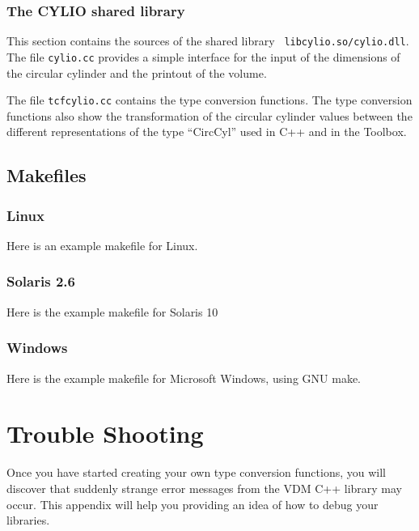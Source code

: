 \documentclass[\pformat,12pt]{article}
\begin{document}
\subsubsection{The CYLIO shared library}\label{sub:cylio}

This section contains the sources of the shared library {\tt
libcylio.so/cylio.dll}. 
The file {\tt cylio.cc} provides a simple interface for the input of the
dimensions of the circular cylinder and the printout of the volume.

The file {\tt tcfcylio.cc} contains the type conversion functions.
The type conversion functions also show the transformation of the
circular cylinder values between the different representations of
the type ``CircCyl'' used in C++ and in the Toolbox.




  
\subsection{Makefiles}\label{makefiles}


\subsubsection{Linux}\label{makefiles:linux}

Here is an example makefile for Linux. 




\subsubsection{Solaris 2.6}\label{makefiles:sunos5}
Here is the example makefile for Solaris 10




\subsubsection{Windows}\label{makefiles:win}
Here is the example makefile for Microsoft Windows, using GNU make.






\section{Trouble Shooting}
Once you have started creating your own type conversion functions, you
will discover that suddenly strange error messages from the VDM C++
library may occur.  This appendix will help you providing an idea of
how to debug your libraries.
\end{document}
